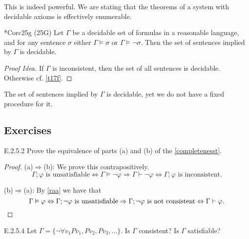 This is indeed powerful. We are stating that the theorems of a system with decidable axioms is effectively enumerable.

\begin{reference}{*Cor}{c25g}
  (25G) Let $\Gamma$ be a decidable set of formulas in a reasonable language, and for any sentence $\sigma$ either $\Gamma\vDash \sigma$ or $\Gamma\vDash\neg \sigma$. Then the set of sentences implied by $\Gamma$ is decidable.
\end{reference}

\begin{proof}[Proof Idea]
  If $\Gamma$ is inconsistent, then the set of all sentences is decidable. Otherwise cf. \ref{t17f}.
\end{proof}

The set of sentences implied by $\Gamma$ is decidable, yet we do not have a fixed procedure for it.


\subsection*{Exercises}

\setcounter{exercise}{1}

\begin{exercise}{E.2.5.2}
  Prove the equivalence of parts (a) and (b) of the \ref{completenesst}.
\end{exercise}

\begin{proof}
  (a)$\Rightarrow$(b): We prove this contrapositively.
  \[
    \Gamma;\varphi\text{ is unsatisfiable}\Leftrightarrow\Gamma\vDash\neg \varphi\Rightarrow \Gamma\vdash \neg\varphi \Leftrightarrow \Gamma;\varphi\text{ is inconsistent}.
  \]

  (b)$\Rightarrow$(a): By \ref{raa} we have that
  \[
    \Gamma\vDash \varphi\Leftrightarrow \Gamma;\neg \varphi\text{ is unsatisfiable}\Rightarrow \Gamma;\neg \varphi\text{ is not consistent}\Leftrightarrow \Gamma\vdash \varphi.\qedhere
  \]
\end{proof}

\setcounter{exercise}{3}

\begin{exercise}{E.2.5.4}
  Let $\Gamma=\{\neg\forall v_1 P v_1, Pv_2, Pv_3,\dots\}.$ Is $\Gamma$ consistent? Is $\Gamma$ satisfiable?
\end{exercise}

